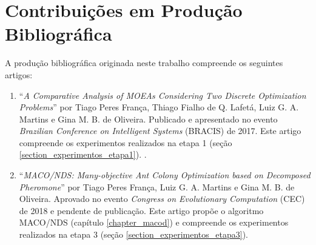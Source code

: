 \section{Contribuições em Produção Bibliográfica}
A produção bibliográfica originada neste trabalho compreende os seguintes artigos:

\begin{enumerate}
	\item ``\textit{A Comparative Analysis of MOEAs Considering Two Discrete Optimization Problems}'' por Tiago Peres França, Thiago Fialho de Q. Lafetá, Luiz G. A. Martins e Gina M. B. de Oliveira. Publicado e apresentado no evento \textit{Brazilian Conference on Intelligent Systems} (BRACIS) de 2017. Este artigo compreende os experimentos realizados na etapa 1 (seção \ref{section_experimentos_etapa1}). \cite{Franca2017}.
	\item ``\textit{MACO/NDS: Many-objective Ant Colony Optimization based on Decomposed
		Pheromone}'' por Tiago Peres França, Luiz G. A. Martins e Gina M. B. de Oliveira. Aprovado no evento \textit{Congress on Evolutionary Computation} (CEC) de 2018 e pendente de publicação. Este artigo propõe o algoritmo MACO/NDS (capítulo \ref{chapter_macod}) e compreende os experimentos realizados na etapa 3 (seção \ref{section_experimentos_etapa3}).
\end{enumerate}